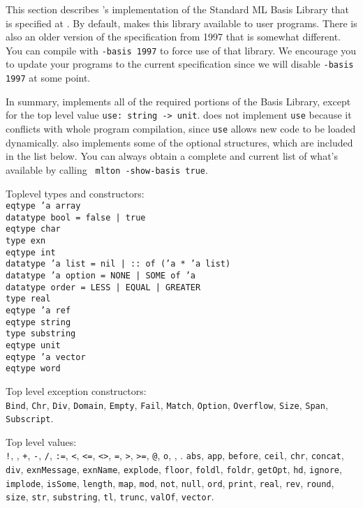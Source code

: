 
This section describes {\mlton}'s implementation of the Standard ML
Basis Library that is specified at
.
By default, {\mlton} makes this library available to user programs.
There is also an older version of the specification from 1997 that is
somewhat different.  You can compile with {\tt -basis 1997} to force
use of that library.  We encourage you to update your programs to the
current specification since we will disable {\tt -basis 1997} at some
point.

In summary, {\mlton} implements all of the required portions of the
Basis Library, except for the top level value
\verb+use: string -> unit+.
{\mlton} does not implement {\tt use} because it conflicts with whole
program compilation, since {\tt use} allows new code to be loaded
dynamically.  {\mlton} also implements some of the optional
structures, which are included in the list below.  You can always
obtain a complete and current list of what's available by calling {\tt
mlton -show-basis true}.

Toplevel types and constructors:\\
{
\tt eqtype 'a array\\
\tt datatype bool = false | true\\
\tt eqtype char\\
\tt type exn\\
\tt eqtype int\\
\tt datatype 'a list = nil | :: of ('a * 'a list)\\
\tt datatype 'a option = NONE | SOME of 'a\\
\tt datatype order = LESS | EQUAL | GREATER\\
\tt type real\\
\tt eqtype 'a ref\\
\tt eqtype string\\
\tt type substring\\
\tt eqtype unit\\
\tt eqtype 'a vector\\
\tt eqtype word\\
}

Top level exception constructors:\\
{\tt Bind},
{\tt Chr},
{\tt Div},
{\tt Domain},
{\tt Empty},
{\tt Fail},
{\tt Match},
{\tt Option},
{\tt Overflow},
{\tt Size},
{\tt Span},
{\tt Subscript}.

Top level values:\\
{\tt !},
{\tt *},
{\tt +},
{\tt -},
{\tt /},
{\tt :=},
{\tt <},
{\tt <=},
{\tt <>},
{\tt =},
{\tt >},
{\tt >=},
{\tt @},
{\tt o},
{\tt {}},
{\tt {}}.
{\tt abs},
{\tt app},
{\tt before},
{\tt ceil},
{\tt chr},
{\tt concat},
{\tt div},
{\tt exnMessage},
{\tt exnName},
{\tt explode},
{\tt floor},
{\tt foldl},
{\tt foldr},
{\tt getOpt},
{\tt hd},
{\tt ignore},
{\tt implode},
{\tt isSome},
{\tt length},
{\tt map},
{\tt mod},
{\tt not},
{\tt null},
{\tt ord},
{\tt print},
{\tt real},
{\tt rev},
{\tt round},
{\tt size},
{\tt str},
{\tt substring},
{\tt tl},
{\tt trunc},
{\tt valOf},
{\tt vector}.

